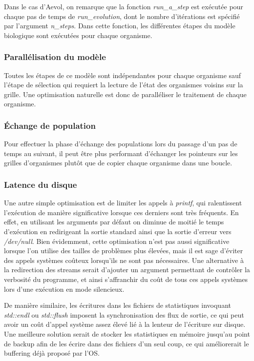 \documentclass[a4paper, 10pt, twoside]{article}
\begin{document}
Dans le cas d'Aevol, on remarque que la fonction \textit{run\_a\_step} est exécutée pour chaque pas de temps de \textit{run\_evolution}, dont le nombre d'itérations est spécifié par l'argument \textit{n\_steps}.
Dans cette fonction, les différentes étapes du modèle biologique sont exécutées pour chaque organisme.

\subsubsection*{Parallélisation du modèle}

Toutes les étapes de ce modèle sont indépendantes pour chaque organisme sauf l'étape de sélection qui requiert la lecture de l'état des organismes voisins sur la grille. Une optimisation naturelle est donc de paralléliser le traitement de chaque organisme\label{parallel/orga}.

\subsubsection*{Échange de population}

Pour effectuer la phase d'échange des populations lors du passage d'un pas de temps au suivant, il peut être plus performant d'échanger les pointeurs sur les grilles d'organismes plutôt que de copier chaque organisme dans une boucle.

\subsubsection*{Latence du disque}

Une autre simple optimisation est de limiter les appels à \textit{printf}, qui ralentissent l'exécution de manière significative lorsque ces derniers sont très fréquents. En effet, en utilisant les arguments par défaut on diminue de moitié le temps d'exécution en redirigeant la sortie standard ainsi que la sortie d'erreur vers \textit{/dev/null}. Bien évidemment, cette optimisation n'est pas aussi significative lorsque l'on utilise des tailles de problèmes plus élevées, mais il est sage d'éviter des appels systèmes coûteux lorsqu'ils ne sont pas nécessaires. Une alternative à la redirection des streams serait d'ajouter un argument permettant de contrôler la verbosité du programme, et ainsi s'affranchir du coût de tous ces appels systèmes lors d'une exécution en mode silencieux.

De manière similaire, les écritures dans les fichiers de statistiques invoquant \textit{std::endl} ou \textit{std::flush} imposent la synchronisation des flux de sortie, ce qui peut avoir un coût d'appel système assez élevé lié à la lenteur de l'écriture sur disque. Une meilleure solution serait de stocker les statistiques en mémoire jusqu'au point de backup afin de les écrire dans des fichiers d'un seul coup, ce qui améliorerait le buffering déjà proposé par l'OS.
\end{document}
